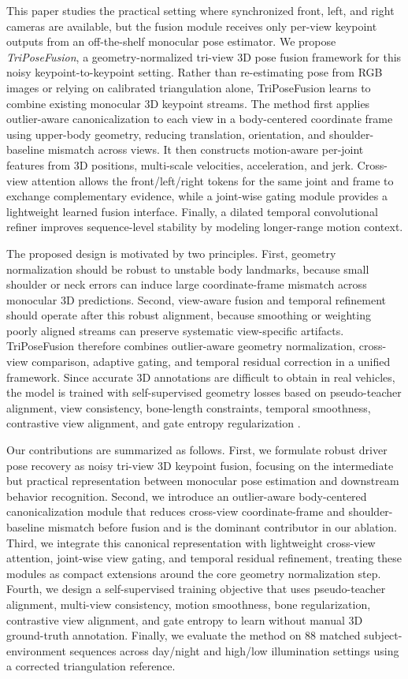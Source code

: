 \documentclass[runningheads]{llncs}
\begin{document}
This paper studies the practical setting where synchronized front, left, and right cameras are available, but the fusion module receives only per-view keypoint outputs from an off-the-shelf monocular pose estimator. We propose \emph{TriPoseFusion}, a geometry-normalized tri-view 3D pose fusion framework for this noisy keypoint-to-keypoint setting. Rather than re-estimating pose from RGB images or relying on calibrated triangulation alone, TriPoseFusion learns to combine existing monocular 3D keypoint streams. The method first applies outlier-aware canonicalization to each view in a body-centered coordinate frame using upper-body geometry, reducing translation, orientation, and shoulder-baseline mismatch across views. It then constructs motion-aware per-joint features from 3D positions, multi-scale velocities, acceleration, and jerk. Cross-view attention allows the front/left/right tokens for the same joint and frame to exchange complementary evidence, while a joint-wise gating module provides a lightweight learned fusion interface. Finally, a dilated temporal convolutional refiner improves sequence-level stability by modeling longer-range motion context.

The proposed design is motivated by two principles. First, geometry normalization should be robust to unstable body landmarks, because small shoulder or neck errors can induce large coordinate-frame mismatch across monocular 3D predictions. Second, view-aware fusion and temporal refinement should operate after this robust alignment, because smoothing or weighting poorly aligned streams can preserve systematic view-specific artifacts. TriPoseFusion therefore combines outlier-aware geometry normalization, cross-view comparison, adaptive gating, and temporal residual correction in a unified framework. Since accurate 3D annotations are difficult to obtain in real vehicles, the model is trained with self-supervised geometry losses based on pseudo-teacher alignment, view consistency, bone-length constraints, temporal smoothness, contrastive view alignment, and gate entropy regularization \cite{rhodin2018learning,kocabas2019self,wandt2021canonpose}.

Our contributions are summarized as follows. First, we formulate robust driver pose recovery as noisy tri-view 3D keypoint fusion, focusing on the intermediate but practical representation between monocular pose estimation and downstream behavior recognition. Second, we introduce an outlier-aware body-centered canonicalization module that reduces cross-view coordinate-frame and shoulder-baseline mismatch before fusion and is the dominant contributor in our ablation. Third, we integrate this canonical representation with lightweight cross-view attention, joint-wise view gating, and temporal residual refinement, treating these modules as compact extensions around the core geometry normalization step. Fourth, we design a self-supervised training objective that uses pseudo-teacher alignment, multi-view consistency, motion smoothness, bone regularization, contrastive view alignment, and gate entropy to learn without manual 3D ground-truth annotation. Finally, we evaluate the method on 88 matched subject-environment sequences across day/night and high/low illumination settings using a corrected triangulation reference.
\end{document}
